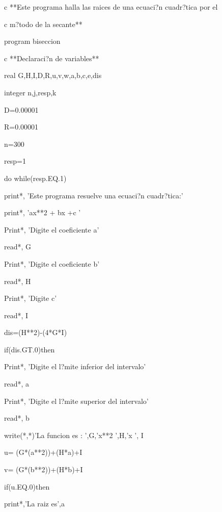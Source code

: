 \setlength{\defaultparindent}{\parindent}
 
%





c     **Este programa halla las raices de una ecuaci?n cuadr?tica 
por el

c     m?todo de la secante**

      program biseccion

      

c     **Declaraci?n de variables**



      real G,H,I,D,R,u,v,w,a,b,c,e,dis

      integer n,j,resp,k

      D=0.00001

      R=0.00001

      n=300

      resp=1

      do while(resp.EQ.1)

        print*, 'Este programa resuelve una ecuaci?n cuadr?tica:'

        print*, 'ax**2 + bx  +c '

        Print*, 'Digite el coeficiente a'

        read*, G

        Print*, 'Digite el coeficiente b'

        read*, H

        Print*, 'Digite  c'

        read*, I

        dis=(H**2)-(4*G*I)

        if(dis.GT.0)then

         Print*, 'Digite el l?mite inferior del intervalo'

         read*, a

         Print*, 'Digite el l?mite superior del intervalo'

         read*, b

         write(*,*)'La funcion es : ',G,'x**2 ',H,'x ', I



         u= (G*(a**2))+(H*a)+I

         v= (G*(b**2))+(H*b)+I

         if(u.EQ.0)then

          print*,'La raiz es',a

